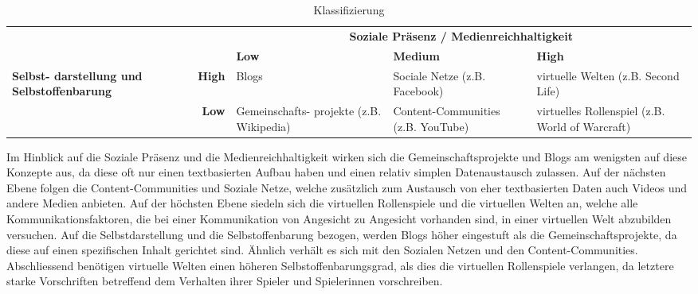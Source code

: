 \begin{table}[ht] \centering
	\caption{Klassifizierung}
	\begin{tabular}[t]{|m{27mm} r|m{28mm}|m{28mm}|m{35mm}|} \hline 
		\multicolumn{2}{|c|}{} & \multicolumn{3}{c|}{\textbf{Soziale Präsenz / Medienreichhaltigkeit}} \\
		\multicolumn{2}{|c|}{} & \cellcolor{gray} \textbf{Low} & \cellcolor{gray} \textbf{Medium} & \cellcolor{gray} \textbf{High} \\ 
			\hline 
		\multirow{2}{27mm}{\textbf{Selbst- darstellung und Selbstoffenbarung}} & \cellcolor{gray}\textbf{High} & Blogs & Sociale Netze (z.B. Facebook) & virtuelle Welten (z.B. Second Life) \\ 
			\cline{2-5}
		& \cellcolor{gray}\textbf{Low} & Gemeinschafts- projekte (z.B. Wikipedia) & Content-Communities (z.B. YouTube) & virtuelles Rollenspiel (z.B. World of Warcraft) \\ 
			\hline
	\end{tabular}
	\label{tab:Klassifiaktion}
\end{table}
 
Im Hinblick auf die Soziale Präsenz und die Medienreichhaltigkeit wirken sich die Gemeinschaftsprojekte und Blogs am wenigsten auf diese Konzepte aus, da diese oft nur einen textbasierten Aufbau haben und einen relativ simplen Datenaustausch zulassen. Auf der nächsten Ebene folgen die Content-Communities und Soziale Netze, welche zusätzlich zum Austausch von eher textbasierten Daten auch Videos und andere Medien anbieten. Auf der höchsten Ebene siedeln sich die virtuellen Rollenspiele und die virtuellen Welten an, welche alle Kommunikationsfaktoren, die bei einer Kommunikation von Angesicht zu Angesicht vorhanden sind, in einer virtuellen Welt abzubilden versuchen. \newline 
Auf die Selbstdarstellung und die Selbstoffenbarung bezogen, werden Blogs höher eingestuft als die Gemeinschaftsprojekte, da diese auf einen spezifischen Inhalt gerichtet sind. Ähnlich verhält es sich mit den Sozialen Netzen und den Content-Communities. Abschliessend benötigen virtuelle Welten einen höheren Selbstoffenbarungsgrad, als dies die virtuellen Rollenspiele verlangen, da letztere starke Vorschriften betreffend dem Verhalten ihrer Spieler und Spielerinnen vorschreiben.

